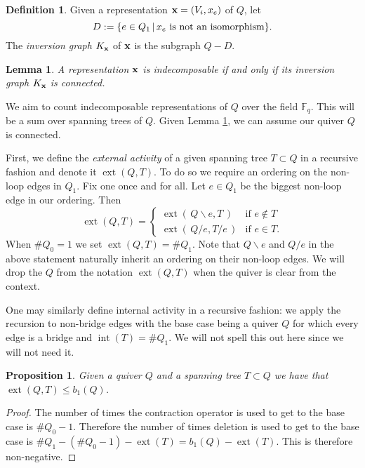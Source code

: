 \documentclass{amsart}
\newtheorem{lem}[thm]{Lemma}
\newtheorem{prop}[thm]{Proposition}
\theoremstyle{definition}
\newtheorem{defn}[thm]{Definition}
\DeclareMathOperator{\intact}{int}
\DeclareMathOperator{\extact}{ext}
\begin{document}
\begin{defn}
Given a representation $\mathbf{x} = (V_i, x_e)$ of $Q$, let $$D:=\{e\in Q_1 \,|\, x_e \textup{ is not an isomorphism}\}.$$   The {\em inversion graph} $K_{\mathbf{x}}$ of $\mathbf{x}$ is the subgraph $Q - D$.
\end{defn}

\begin{lem}\label{lm:coninvgr}
A representation $\mathbf{x}$ is indecomposable if and only if its inversion graph $K_{\mathbf{x}}$ is connected.
\end{lem}

We aim to count indecomposable representations of $Q$ over the field $\mathbb{F}_q$.
This will be a sum over spanning trees of $Q$.
Given Lemma \ref{lm:coninvgr}, we can assume our quiver $Q$ is connected.

First, we define the {\em external activity} of a given spanning tree $T \subset Q$ in a recursive fashion and denote it $\extact(Q,T)$.
To do so we require an ordering on the non-loop edges in $Q_1$.
Fix one once and for all.
Let $e \in Q_1$ be the biggest non-loop edge in our ordering. Then
$$\extact(Q,T) = \begin{cases} \extact(\,{Q\backslash e, T}\,) & \text{if } e \notin T \\ \extact(\,{Q/e, T/e}\,) & \text{if } e \in T.\end{cases}
$$
When $\# Q_0 =1$ we set $\extact(Q,T)= \# Q_1.$
Note that $Q\backslash e$ and $Q/e$ in the above statement naturally inherit an ordering on their non-loop edges.
We will drop the $Q$ from the notation $\extact(Q,T)$ when the quiver is clear from the context.

One may similarly define internal activity in a recursive fashion: we apply the recursion to non-bridge edges with the base case being a quiver $Q$ for which every edge is a bridge and $\intact(T)=\#Q_1$.
We will not spell this out here since we will not need it.

\begin{prop}\label{prop:euler}
Given a quiver $Q$ and a spanning tree $T \subset Q$ we have that $\extact(Q,T) \leq b_1(Q)$.
\end{prop}

\begin{proof}
The number of times the contraction operator is used to get to the base case is $\#Q_0-1$. 
Therefore the number of times deletion is used to get to the base case is $\#Q_1-(\#Q_0-1) - \extact(T)= b_1(Q)-\extact(T)$.
This is therefore non-negative.
\end{proof}
\end{document}
